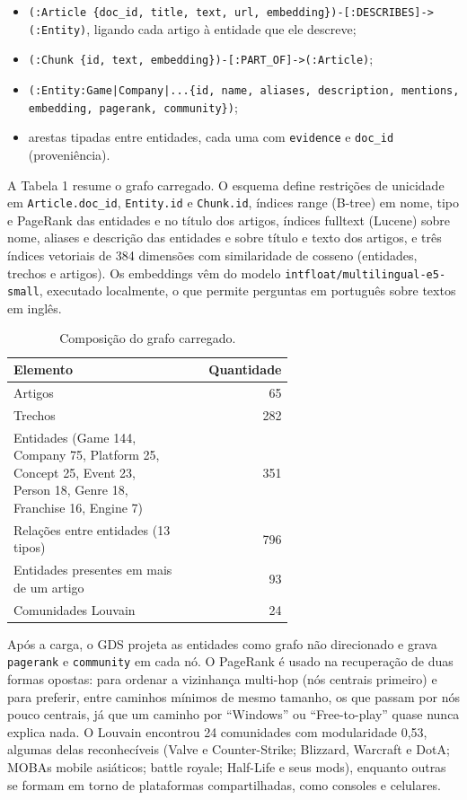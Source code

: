 \documentclass[12pt]{article}
\begin{document}
\begin{itemize}\item \texttt{(:Article \{doc\_id, title, text, url, embedding\})-[:DESCRIBES]->(:Entity)}, ligando cada artigo à entidade que ele descreve;
\item \texttt{(:Chunk \{id, text, embedding\})-[:PART\_OF]->(:Article)};
\item \texttt{(:Entity:Game|Company|...\{id, name, aliases, description, mentions, embedding, pagerank, community\})};
\item arestas tipadas entre entidades, cada uma com \texttt{evidence} e \texttt{doc\_id} (proveniência).
\end{itemize}
A Tabela 1 resume o grafo carregado. O esquema define restrições de unicidade em \texttt{Article.doc\_id}, \texttt{Entity.id} e \texttt{Chunk.id}, índices range (B-tree) em nome, tipo e PageRank das entidades e no título dos artigos, índices fulltext (Lucene) sobre nome, aliases e descrição das entidades e sobre título e texto dos artigos, e três índices vetoriais de 384 dimensões com similaridade de cosseno (entidades, trechos e artigos). Os embeddings vêm do modelo \texttt{intfloat/multilingual-e5-small}, executado localmente, o que permite perguntas em português sobre textos em inglês.

\begin{table}[ht]\centering\small
\caption{Composição do grafo carregado.}
\begin{tabular}{p{0.62\linewidth}r}\toprule
\textbf{Elemento} & \textbf{Quantidade} \\ \midrule
Artigos & 65 \\
Trechos & 282 \\
Entidades (Game 144, Company 75, Platform 25, Concept 25, Event 23, Person 18, Genre 18, Franchise 16, Engine 7) & 351 \\
Relações entre entidades (13 tipos) & 796 \\
Entidades presentes em mais de um artigo & 93 \\
Comunidades Louvain & 24 \\
\bottomrule\end{tabular}
\end{table}
Após a carga, o GDS projeta as entidades como grafo não direcionado e grava \texttt{pagerank} e \texttt{community} em cada nó. O PageRank é usado na recuperação de duas formas opostas: para ordenar a vizinhança multi-hop (nós centrais primeiro) e para preferir, entre caminhos mínimos de mesmo tamanho, os que passam por nós pouco centrais, já que um caminho por ``Windows'' ou ``Free-to-play'' quase nunca explica nada. O Louvain encontrou 24 comunidades com modularidade 0,53, algumas delas reconhecíveis (Valve e Counter-Strike; Blizzard, Warcraft e DotA; MOBAs mobile asiáticos; battle royale; Half-Life e seus mods), enquanto outras se formam em torno de plataformas compartilhadas, como consoles e celulares.
\end{document}
